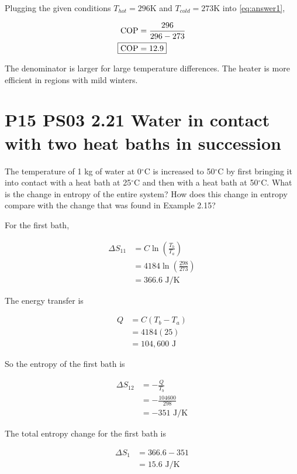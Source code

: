 \documentclass[9pt,a4paper,twocolumn]{article}
\begin{document}
Plugging the given conditions $T_{hot} = 296$K and $T_{cold} = 273$K into \eqref{eq:answer1},

\begin{align}
	\textrm{COP} &= \frac{296}{296-273} \nonumber \\
	\Aboxed{\textrm{COP} &= 12.9} \label{eq:answer2}
\end{align}

The denominator is larger for large temperature differences. The heater is more efficient in regions with mild winters.

\section{P15 PS03 2.21 Water in contact with two heat baths in succession}
The temperature of 1 kg of water at 0$^\circ$C is increased to 50$^\circ$C by first bringing it into contact
with a heat bath at 25$^\circ$C and then with a heat bath at 50$^\circ$C. What is the change in entropy of the entire system? How does this change in entropy compare with the change that was found in Example 2.15?

For the first bath,

\begin{align}\label{eq:entropy1}
	\Delta S_{11} &= C\ln{\left( \frac{T_b}{T_a} \right)} \\
	&= 4184\ln{\left( \frac{298}{273} \right)} \nonumber \\
	&= 366.6 \textrm{ J/K}
\end{align}

The energy transfer is

\begin{align}
	Q &= C \left( T_b - T_a \right) \\
	&= 4184(25) \nonumber \\
	&= 104,600 \textrm{ J}
\end{align}

So the entropy of the first bath is

\begin{align}
	\Delta S_{12} &= -\frac{Q}{T_b} \\
	&= -\frac{104 600}{298} \nonumber \\
	&= -351 \textrm{ J/K}
\end{align}

The total entropy change for the first bath is

\begin{align}
	\Delta S_1 &= 366.6 - 351 \\
	&= 15.6 \textrm{ J/K}
\end{align}
\end{document}
